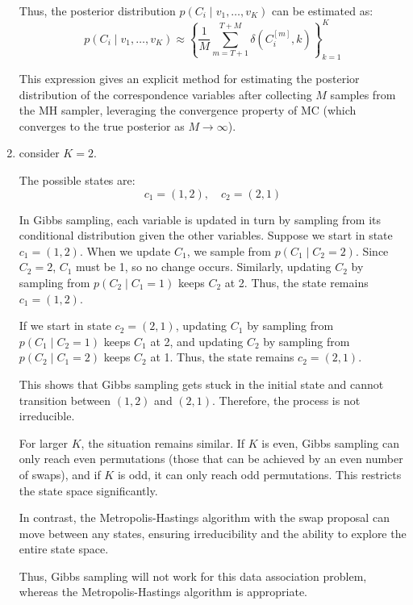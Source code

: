 \documentclass[a4 paper]{article}
\begin{document}
\begin{enumerate}
    Thus, the posterior distribution \( p(C_i \mid v_1, \ldots, v_K) \) can be estimated as:
    \[
    p(C_i \mid v_1, \ldots, v_K) \approx \left\{ \frac{1}{M} \sum_{m=T+1}^{T+M} \delta(C_i^{[m]}, k) \right\}_{k=1}^{K}
    \]

    This expression gives an explicit method for estimating the posterior distribution of the correspondence variables after collecting \( M \) 
    samples from the MH sampler, leveraging the convergence property of MC (which converges to the true posterior as \( M \to \infty \)).


    \item {}
    
    consider \( K = 2 \).

    The possible states are:
    \[
    c_1 = (1, 2), \quad c_2 = (2, 1)
    \]
    
    In Gibbs sampling, each variable is updated in turn by sampling from its conditional distribution given the other variables. Suppose we start in state \( c_1 = (1, 2) \). When we update \( C_1 \), we sample from \( p(C_1 \mid C_2 = 2) \). Since \( C_2 = 2 \), \( C_1 \) must be 1, so no change occurs. Similarly, updating \( C_2 \) by sampling from \( p(C_2 \mid C_1 = 1) \) keeps \( C_2 \) at 2. Thus, the state remains \( c_1 = (1, 2) \).
    
    If we start in state \( c_2 = (2, 1) \), updating \( C_1 \) by sampling from \( p(C_1 \mid C_2 = 1) \) keeps \( C_1 \) at 2, and updating \( C_2 \) by sampling from \( p(C_2 \mid C_1 = 2) \) keeps \( C_2 \) at 1. Thus, the state remains \( c_2 = (2, 1) \).
    
    This shows that Gibbs sampling gets stuck in the initial state and cannot transition between \( (1, 2) \) and \( (2, 1) \). Therefore, the process is not irreducible.
    
    For larger \( K \), the situation remains similar. If \( K \) is even, Gibbs sampling can only reach even permutations (those that can be achieved by an even number of swaps), and if \( K \) is odd, it can only reach odd permutations. This restricts the state space significantly.
    
    In contrast, the Metropolis-Hastings algorithm with the swap proposal can move between any states, ensuring irreducibility and the ability to explore the entire state space.
    
    Thus, Gibbs sampling will not work for this data association problem, whereas the Metropolis-Hastings algorithm is appropriate.

\end{enumerate}
\end{document}

